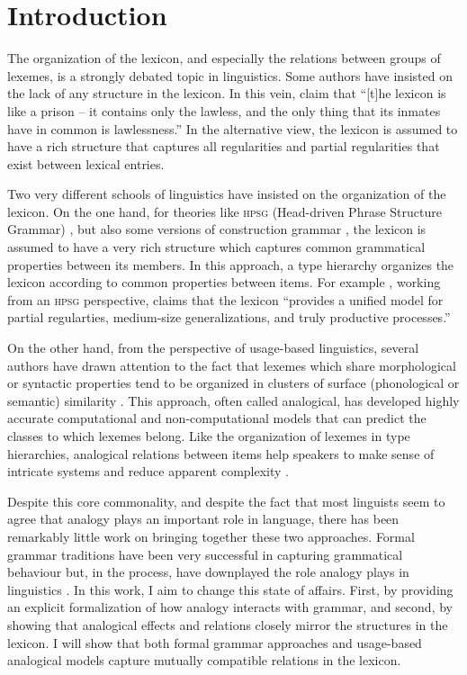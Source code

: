 \chapter{Introduction}\label{chap:introduction}
\largerpage
The organization of the lexicon, and especially the relations between groups of lexemes, is a strongly debated topic in linguistics. Some authors have insisted on the lack of any structure in the lexicon.
In this vein, \textcite[3]{DiSciullo.1987} claim that ``[t]he lexicon is like a prison -- it contains only the lawless, and the only thing that its inmates have in common is lawlessness.''
In the alternative view, the lexicon is assumed to have a rich structure that captures all regularities and partial regularities that exist between lexical entries.

Two very different schools of linguistics have insisted on the organization of the lexicon.
On the one hand, for theories like \textsc{hpsg} (Head-driven Phrase Structure Grammar) \autocite{Pollard.1994}, but also some versions of construction grammar \autocite{Fillmore.1995}, the lexicon is assumed to have a very rich structure which captures common grammatical properties between its members.
In this approach, a type hierarchy organizes the lexicon according to common properties between items.
For example \textcite[4, among others]{Koenig.1999}, working from an \textsc{hpsg} perspective, claims that the lexicon ``provides a unified model for partial regularties, medium-size generalizations, and truly productive processes.''

On the other hand, from the perspective of usage-based linguistics, several authors have drawn attention to the fact that lexemes which share morphological or syntactic properties tend to be organized in clusters of surface (phonological or semantic) similarity \autocites{Bybee.1982, Eddington.1996, Skousen.1989}.
This approach, often called analogical, has developed highly accurate computational and non-computational models that can predict the classes to which lexemes belong.
Like the organization of lexemes in type hierarchies, analogical relations between items help speakers to make sense of intricate systems and reduce apparent complexity \autocite{Kopcke.1984}.

\largerpage
Despite this core commonality, and despite the fact that most linguists seem to agree that analogy plays an important role in language, there has been remarkably little work on bringing together these two approaches.
Formal grammar traditions have been very successful in capturing grammatical behaviour but, in the process, have downplayed the role analogy plays in linguistics \autocite{Anderson.2015}.
In this work, I aim to change this state of affairs.
First, by providing an explicit formalization of how analogy interacts with grammar, and second, by showing that analogical effects and relations closely mirror the structures in the lexicon.
I will show that both formal grammar approaches and usage-based analogical models capture mutually compatible relations in the lexicon.

